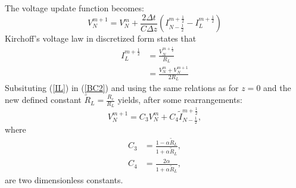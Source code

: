 \documentclass[dutch, a4paper, 11pt]{article}
\begin{document}
\begin{multicols}{2}
\begin{itemize}
    The voltage update function becomes:
    \begin{equation}
        V^{m+1}_{N} = V^{m}_{N} + \frac{2\Delta t}{C\Delta z}\left(I^{m+\frac{1}{2}}_{N-\frac{1}{2}} - I^{m+\frac{1}{2}}_{L}\right)
        \label{BC2}
    \end{equation}
    Kirchoff's voltage law in discretized form states that
    \begin{align}
        I^{m+\frac{1}{2}}_{L} & = \frac{V^{m+\frac{1}{2}}_{N}}{R_{L}}\\
        & = \frac{V^{m}_{N}+V^{m+1}_{N}}{2R_{L}}
        \label{IL}
    \end{align}
    Subsituting (\ref{IL}) in (\ref{BC2}) and using the same relations as for $z=0$ and the new defined constant $\tilde{R}_{L} = \frac{R_c}{R_L}$ yields, 
    after some rearrangements:
    \begin{equation}
        V^{m+1}_{N} = C_{3}V^{m}_N + C_{4}\tilde{I}^{m+\frac{1}{2}}_{N-\frac{1}{2}},
    \end{equation}
    where
    \begin{align}
        C_{3} & = \frac{1-\alpha\tilde{R}_{L}}{1+\alpha\tilde{R}_{L}},\\
        C_{4} & = \frac{2\alpha}{1+\alpha\tilde{R}_{L}},
    \end{align}
    are two dimensionless constants.


\end{itemize}
\end{multicols}
\end{document}
